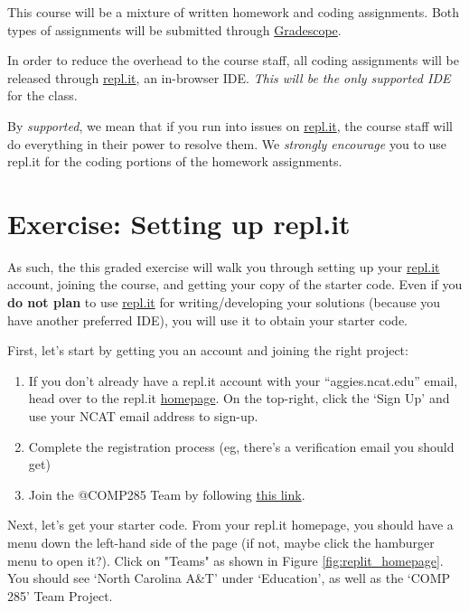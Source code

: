 \documentclass [12pt]{article}
\begin{document}
This course will be a mixture of written homework and coding assignments. Both types of assignments will be submitted through \href{https://www.gradescope.com/courses/350304}{Gradescope}.

In order to reduce the overhead to the course staff, all coding assignments will be released through \href{https://repl.it/}{repl.it}, an in-browser IDE. \textit{This will be the only supported IDE} for the class.

By \textit{supported}, we mean that if you run into issues on \href{https://repl.it/}{repl.it}, the course staff will do everything in their power to resolve them. We \textit{strongly encourage} you to use repl.it for the coding portions of the homework assignments.


\section {Exercise: Setting up repl.it}
 As such, the this graded exercise will walk you through setting up your \href{https://repl.it/}{repl.it} account, joining the course, and getting your copy of the starter code. Even if you \textbf{do not plan} to use \href{https://repl.it/}{repl.it} for writing/developing your solutions (because you have another preferred IDE), you will use it to obtain your starter code. 

First, let's start by getting you an account and joining the right project:

\begin{enumerate}
    \item If you don't already have a repl.it account with your ``aggies.ncat.edu'' email, head over to the repl.it \href{https://repl.it/}{homepage}. On the top-right, click the `Sign Up' and use your NCAT email address to sign-up.
    \item Complete the registration process (eg, there's a verification email you should get)
    \item Join the @COMP285 Team by following \href{https://repl.it/teams/join/axywewyfiltmqtcgovikrywbqisfdgss-COMP285}{this link}.
\end{enumerate}

Next, let's get your starter code. From your repl.it homepage, you should have a menu down the left-hand side of the page (if not, maybe click the hamburger menu to open it?). Click on "Teams" as shown in Figure \ref{fig:replit_homepage}. You should see `North Carolina A\&T' under `Education', as well as the `COMP 285' Team Project.
\end{document}
